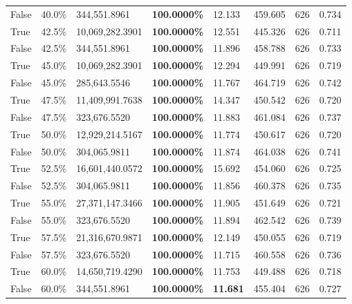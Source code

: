 \begin{table}[H]
\begin{tabular}{lllrllll}
\cline{1-8}
False & 40.0\% & 344,551.8961 & \bfseries \color{red} 100.0000\% & 12.133 & 459.605 & 626 & 0.734 \\
\cline{1-8}
True & 42.5\% & 10,069,282.3901 & \bfseries \color{red} 100.0000\% & 12.551 & 445.326 & 626 & 0.711 \\
\cline{1-8}
False & 42.5\% & 344,551.8961 & \bfseries \color{red} 100.0000\% & 11.896 & 458.788 & 626 & 0.733 \\
\cline{1-8}
True & 45.0\% & 10,069,282.3901 & \bfseries \color{red} 100.0000\% & 12.294 & 449.991 & 626 & 0.719 \\
\cline{1-8}
False & 45.0\% & \color{red} 285,643.5546 & \bfseries \color{red} 100.0000\% & 11.767 & 464.719 & 626 & 0.742 \\
\cline{1-8}
True & 47.5\% & 11,409,991.7638 & \bfseries \color{red} 100.0000\% & 14.347 & 450.542 & 626 & 0.720 \\
\cline{1-8}
False & 47.5\% & 323,676.5520 & \bfseries \color{red} 100.0000\% & 11.883 & 461.084 & 626 & 0.737 \\
\cline{1-8}
True & 50.0\% & 12,929,214.5167 & \bfseries \color{red} 100.0000\% & 11.774 & 450.617 & 626 & 0.720 \\
\cline{1-8}
False & 50.0\% & 304,065.9811 & \bfseries \color{red} 100.0000\% & 11.874 & 464.038 & 626 & 0.741 \\
\cline{1-8}
True & 52.5\% & 16,601,440.0572 & \bfseries \color{red} 100.0000\% & 15.692 & 454.060 & 626 & 0.725 \\
\cline{1-8}
False & 52.5\% & 304,065.9811 & \bfseries \color{red} 100.0000\% & 11.856 & 460.378 & 626 & 0.735 \\
\cline{1-8}
True & 55.0\% & 27,371,147.3466 & \bfseries \color{red} 100.0000\% & 11.905 & 451.649 & 626 & 0.721 \\
\cline{1-8}
False & 55.0\% & 323,676.5520 & \bfseries \color{red} 100.0000\% & 11.894 & 462.542 & 626 & 0.739 \\
\cline{1-8}
True & 57.5\% & 21,316,670.9871 & \bfseries \color{red} 100.0000\% & 12.149 & 450.055 & 626 & 0.719 \\
\cline{1-8}
False & 57.5\% & 323,676.5520 & \bfseries \color{red} 100.0000\% & 11.715 & 460.558 & 626 & 0.736 \\
\cline{1-8}
True & 60.0\% & 14,650,719.4290 & \bfseries \color{red} 100.0000\% & 11.753 & 449.488 & 626 & 0.718 \\
\cline{1-8}
False & 60.0\% & 344,551.8961 & \bfseries \color{red} 100.0000\% & \bfseries \color{red} 11.681 & 455.404 & 626 & 0.727 \\

\end{tabular}
\end{table}
